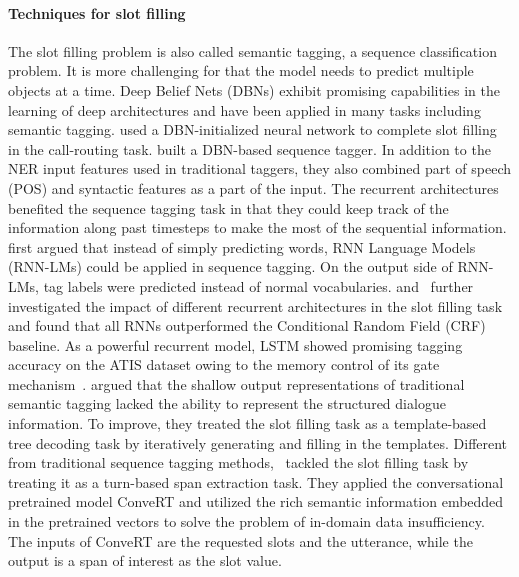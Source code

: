 \paragraph*{Techniques for slot filling} The slot filling problem is also called semantic tagging, a sequence classification problem. It is more challenging for that the model needs to predict multiple objects at a time. Deep Belief Nets (DBNs) exhibit promising capabilities in the learning of deep architectures and have been applied in many tasks including semantic tagging.  used a DBN-initialized neural network to complete slot filling in the call-routing task.  built a DBN-based sequence tagger. In addition to the NER input features used in traditional taggers, they also combined part of speech (POS) and syntactic features as a part of the input. The recurrent architectures benefited the sequence tagging task in that they could keep track of the information along past timesteps to make the most of the sequential information.  first argued that instead of simply predicting words, RNN Language Models (RNN-LMs) could be applied in sequence tagging. On the output side of RNN-LMs, tag labels were predicted instead of normal vocabularies.  and~ further investigated the impact of different recurrent architectures in the slot filling task and found that all RNNs outperformed the Conditional Random Field (CRF) baseline. As a powerful recurrent model, LSTM showed promising tagging accuracy on the ATIS dataset owing to the memory control of its gate mechanism~. 
 argued that the shallow output representations of traditional semantic tagging lacked the ability to represent the structured dialogue information. To improve, they treated the slot filling task as a template-based tree decoding task by iteratively generating and filling in the templates. Different from traditional sequence tagging methods,~ tackled the slot filling task by treating it as a turn-based span extraction task. They applied the conversational pretrained model ConveRT and utilized the rich semantic information embedded in the pretrained vectors to solve the problem of in-domain data insufficiency. The inputs of ConveRT are the requested slots and the utterance, while the output is a span of interest as the slot value. 
